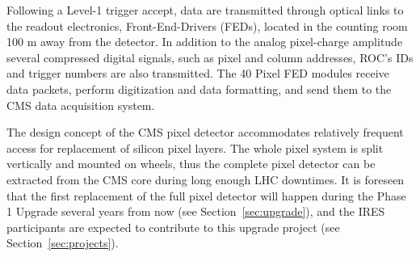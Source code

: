 Following a Level-1 trigger accept, data are transmitted through optical 
links to the readout 
electronics, Front-End-Drivers (FEDs), located in the counting room 100 m 
away from the detector. 
In addition to the analog pixel-charge amplitude several compressed 
digital signals, such 
as pixel and column addresses, ROC's IDs and trigger numbers are also 
transmitted. 
The 40 Pixel FED modules receive data packets, perform digitization and 
data formatting, 
and send them to the CMS data acquisition system.

The design concept of the CMS pixel detector accommodates relatively 
frequent access for 
replacement of silicon pixel layers.
The whole pixel
system is split vertically and mounted on wheels, thus the complete
pixel detector can be extracted from the CMS core during long enough LHC downtimes.
It is foreseen that the first replacement of the full pixel detector will
happen during the Phase 1 Upgrade several years from now (see Section~\ref{sec:upgrade}),
and the IRES participants are expected to contribute to this upgrade project
(see Section~\ref{sec:projects}).




